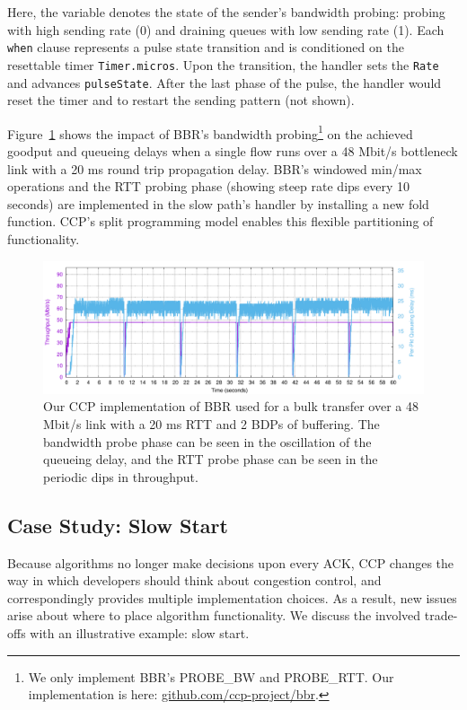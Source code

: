 Here, the variable  denotes the state of the sender's
bandwidth probing: probing with high sending rate (0) and draining queues with low
sending rate (1).
Each \texttt{when} clause represents a pulse state transition and is conditioned on the
resettable timer \texttt{Timer.micros}.
Upon the transition, the handler sets the \texttt{Rate} and advances \texttt{pulseState}.
After the last phase of the pulse, the handler would reset the timer and  to restart the sending pattern (not shown).

Figure~\ref{fig:ccp:bbr} shows
the impact of BBR's bandwidth probing\footnote{We only implement BBR's PROBE\_BW and PROBE\_RTT. Our implementation is here: \url{github.com/ccp-project/bbr}.} on the
achieved goodput and queueing delays when a single flow runs over a 48 Mbit/s
bottleneck link with a 20 ms round trip propagation delay.
%
BBR's windowed min/max operations and the RTT probing phase (showing steep rate
dips every 10 seconds) are implemented in the slow path's 
handler by installing a new fold function.
%
CCP's split programming model enables this flexible partitioning of functionality.

\begin{figure}[h]
\centering
    \includegraphics[width=\columnwidth]{img/bbr}
    \caption{
    Our CCP implementation of BBR used for a bulk transfer over a 48 Mbit/s link with a 20 ms RTT and 2 BDPs of buffering. The bandwidth probe phase can be seen in the oscillation of the queueing delay, and the RTT probe phase can be seen in the periodic dips in throughput.
    }\label{fig:ccp:bbr}
\end{figure}

\subsection{Case Study: Slow Start}
\label{s:ccp:ss}

Because algorithms no longer make decisions upon every ACK, CCP changes the way in which developers should think about congestion control, and correspondingly provides multiple implementation choices. As a result, new issues arise about where to place algorithm functionality. We discuss the involved trade-offs with an illustrative example: slow start.

